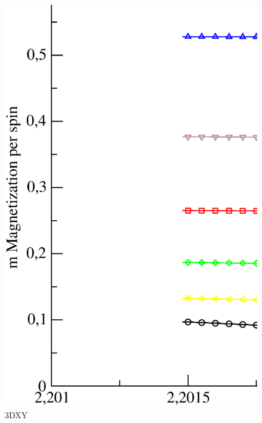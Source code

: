 \begin{figure}[!htpb]
  \centering
  \includegraphics[width=15cm]{./plots/3DXY/3DXY_Magnetization_vs_Temperature.eps}
  \caption{3DXY}
\end{figure}

